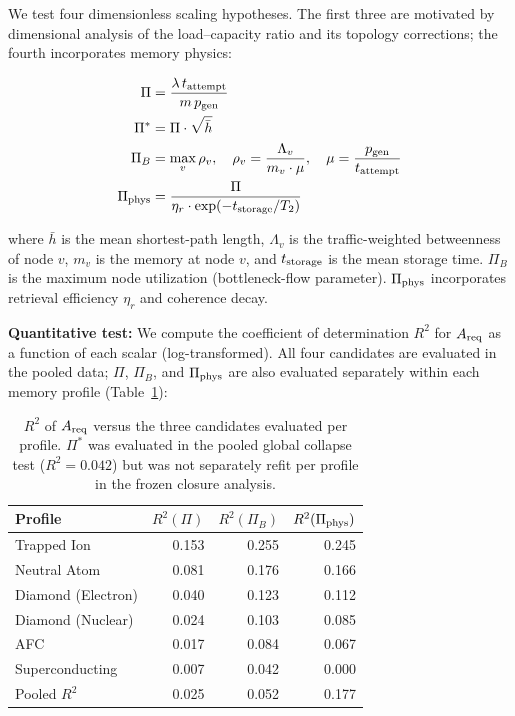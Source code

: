 \documentclass[quantumrep,article,submit,moreauthors]{Definitions/mdpi}
\begin{document}
We test four dimensionless scaling hypotheses. The first three are motivated by dimensional analysis of the load--capacity ratio and its topology corrections; the fourth incorporates memory physics:

\begin{align}
\Pi &= \frac{\lambda \, t_{\rm attempt}}{m \, p_{\rm gen}} \\
\Pi^* &= \Pi \cdot \sqrt{\bar{h}} \\
\Pi_B &= \max_v \rho_v, \quad \rho_v = \frac{\Lambda_v}{m_v \cdot \mu}, \quad \mu = \frac{p_{\rm gen}}{t_{\rm attempt}} \\
\Pi_{\rm phys} &= \frac{\Pi}{\eta_r \cdot \exp(-t_{\rm storage}/T_2)}
\end{align}

where $\bar{h}$ is the mean shortest-path length, $\Lambda_v$ is the traffic-weighted betweenness of node $v$, $m_v$ is the memory at node $v$, and $t_{\rm storage}$ is the mean storage time. $\Pi_B$ is the maximum node utilization (bottleneck-flow parameter). $\Pi_{\rm phys}$ incorporates retrieval efficiency $\eta_r$ and coherence decay.

\textbf{Quantitative test:} We compute the coefficient of determination $R^2$ for $A_{\rm req}$ as a function of each scalar (log-transformed). All four candidates are evaluated in the pooled data; $\Pi$, $\Pi_B$, and $\Pi_{\rm phys}$ are also evaluated separately within each memory profile (Table~\ref{tab:r2}):

\begin{table}[htbp]
\centering
\caption{$R^2$ of $A_{\rm req}$ versus the three candidates evaluated per profile. $\Pi^*$ was evaluated in the pooled global collapse test ($R^2=0.042$) but was not separately refit per profile in the frozen closure analysis.}
\label{tab:r2}
\begin{tabular}{lrrr}
\toprule
Profile & $R^2(\Pi)$ & $R^2(\Pi_B)$ & $R^2(\Pi_{\rm phys})$ \\
\midrule
Trapped Ion & 0.153 & 0.255 & 0.245 \\
Neutral Atom & 0.081 & 0.176 & 0.166 \\
Diamond (Electron) & 0.040 & 0.123 & 0.112 \\
Diamond (Nuclear) & 0.024 & 0.103 & 0.085 \\
AFC & 0.017 & 0.084 & 0.067 \\
Superconducting & 0.007 & 0.042 & 0.000 \\
\midrule
Pooled $R^2$ & 0.025 & 0.052 & 0.177 \\
\bottomrule
\end{tabular}
\end{table}
\end{document}
